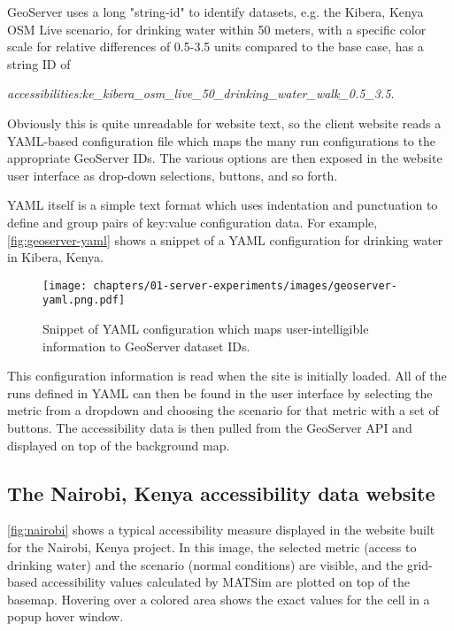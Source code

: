 GeoServer uses a long "string-id" to identify datasets, e.g. the Kibera, Kenya OSM Live scenario, for drinking water within 50 meters, with a specific color scale for relative differences of 0.5-3.5 units compared to the base case, has a string ID of

\emph{accessibilities:ke\_kibera\_osm\_live\_50\_drinking\_water\_walk\_0.5\_3.5}.

Obviously this is quite unreadable for website text, so the client website reads a YAML-based configuration file which maps the many run configurations to the appropriate GeoServer IDs. The various options are then exposed in the website user interface as drop-down selections, buttons, and so forth.

YAML itself is a simple text format which uses indentation and punctuation to define and group pairs of key:value configuration data. For example, \autoref{fig:geoserver-yaml} shows a snippet of a YAML configuration for drinking water in Kibera, Kenya.

\begin{figure}[!ht]
  \texttt{[image: chapters/01-server-experiments/images/geoserver-yaml.png.pdf]}
  \caption[GeoServer YAML configuration example]{Snippet of YAML configuration which maps user-intelligible information to GeoServer dataset IDs.}
  \label{fig:geoserver-yaml}
\end{figure}

This configuration information is read when the site is initially loaded. All of the runs defined in YAML can then be found in the user interface by selecting the metric from a dropdown and choosing the scenario for that metric with a set of buttons. The accessibility data is then pulled from the GeoServer API and displayed on top of the background map.

\hypertarget{server-experiments-geoserver-3}{%
\subsection{The Nairobi, Kenya accessibility data website}
\label{server-experiments-geoserver-3}}

\autoref{fig:nairobi} shows a typical accessibility measure displayed in the website built for the Nairobi, Kenya project. In this image, the selected metric (access to drinking water) and the scenario (normal conditions) are visible, and the grid-based accessibility values calculated by MATSim are plotted on top of the basemap. Hovering over a colored area shows the exact values for the cell in a popup hover window.

